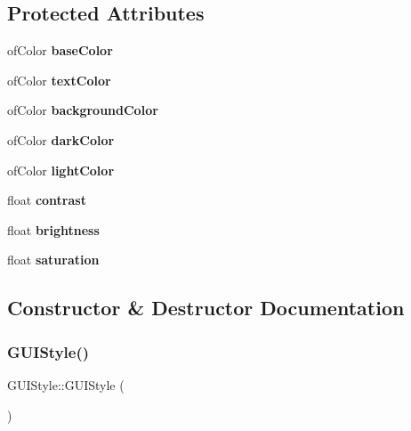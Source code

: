 \subsection*{Protected Attributes}
\begin{DoxyCompactItemize}
\item 
\mbox{\label{class_g_u_i_style_a617489724e0218a5f99d004309d1a722}} 
of\+Color {\bfseries base\+Color}
\item 
\mbox{\label{class_g_u_i_style_ad7888e352c6804476db6a30594f9eed8}} 
of\+Color {\bfseries text\+Color}
\item 
\mbox{\label{class_g_u_i_style_ad578fd6095911a0e79c677a642e65875}} 
of\+Color {\bfseries background\+Color}
\item 
\mbox{\label{class_g_u_i_style_a3ce1434ebb29dba091b748f58522e70e}} 
of\+Color {\bfseries dark\+Color}
\item 
\mbox{\label{class_g_u_i_style_a64d8f405169236edf4f9ace94bb225c5}} 
of\+Color {\bfseries light\+Color}
\item 
\mbox{\label{class_g_u_i_style_ad2f8bf7bd9e39363c68d31790c4ba255}} 
float {\bfseries contrast}
\item 
\mbox{\label{class_g_u_i_style_a7402c7a95198c6325886034bb6c2ee78}} 
float {\bfseries brightness}
\item 
\mbox{\label{class_g_u_i_style_a6ef00876c6c45b60a006cdeebe880b35}} 
float {\bfseries saturation}
\end{DoxyCompactItemize}


\subsection{Constructor \& Destructor Documentation}
\mbox{\label{class_g_u_i_style_a8e1f0cf754c901dd452beb98f518d152}} 
\subsubsection{\texorpdfstring{G\+U\+I\+Style()}{GUIStyle()}}
{\footnotesize\ttfamily G\+U\+I\+Style\+::\+G\+U\+I\+Style (\begin{DoxyParamCaption}\item[{\hyperlink{class_g_u_i_style}{G\+U\+I\+Style} const \&}]{ }\end{DoxyParamCaption})\hspace{0.3cm}{\ttfamily [delete]}}

